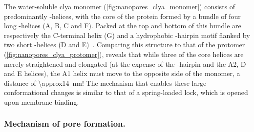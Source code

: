 The water-soluble \gls{clya} monomer (\cref{fig:nanopores_clya_monomer}) consists of predominantly
\ta-helices, with the core of the protein formed by a bundle of four long \ta-helices (\ta A, \ta B, \ta C and
\ta F). Packed at the top and bottom of this bundle are respectively the C-terminal helix (\ta G) and a
hydrophobic \tb-hairpin motif flanked by two short \ta-helices (\ta{}D and
\ta{}E)~\cite{Wallace-2000,Mueller-2009}. Comparing this structure to that of the protomer
(\cref{fig:nanopores_clya_protomer}), reveals that while three of the core helices are merely straightened and
elongated (at the expense of the \tb-hairpin and the \ta{}A2, \ta{}D and \ta{}E helices), the \ta{}A1 helix
must move to the opposite side of the monomer, a distance of \SI{\approx14}{\nm}! The mechanism that enables
these large conformational changes is similar to that of a spring-loaded lock, which is opened upon membrane
binding.

\subsubsection{Mechanism of pore formation.}
%


